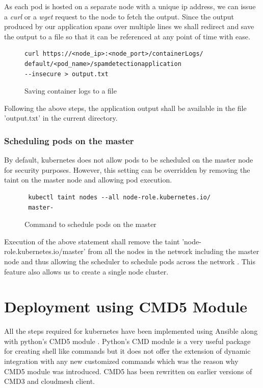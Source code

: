 \documentclass[9pt,twocolumn,twoside]{../../styles/osajnl}
\begin{document}
{\noindent
As each pod is hosted on a separate node with a unique ip address, we
can issue a \emph{curl} or a \emph{wget} request to the node to fetch
the output.  Since the output produced by our application spans over
multiple lines we shall redirect and save the output to a file so that
it can be referenced at any point of time with ease.
\begin{figure}[H]
\begin{verbatim}
curl https://<node_ip>:<node_port>/containerLogs/
default/<pod_name>/spamdetectionapplication 
--insecure > output.txt
\end{verbatim}
\caption{Saving container logs to a file}
\vspace{-4mm}
\label{Saving container logs to a file}
\end{figure}

\noindent
Following the above steps, the application output shall be available
in the file 'output.txt' in the current directory.


\subsubsection{Scheduling pods on the master}
By default, kubernetes does not allow pods to be
scheduled on the master node for security purposes. However, this
setting can be overridden by removing the taint on the master node and
allowing pod execution.
\begin{figure}[H]
\begin{verbatim}
 kubectl taint nodes --all node-role.kubernetes.io/
 master-
\end{verbatim}
\caption{Command to schedule pods on the master}
\vspace{-4mm}
\label{Command to schedule pods on the master}
\end{figure}

\noindent
Execution of the above statement shall remove the taint
'node-role.kubernetes.io/master' from all the nodes in the network
including the master node and thus allowing the scheduler to schedule
pods across the network \cite{www-kubernetes-kubeadm}. This feature
also allows us to create a single node cluster.

\section{Deployment using CMD5 Module}
All the steps required for kubernetes have been implemented using
Ansible along with python's CMD5 module \cite{www-cmd5}. Python's
CMD module is a very useful package for creating shell like commands
but it does not offer the extension of dynamic integration with any
new customized commands which was the reason why CMD5 module was
introduced. CMD5 has been rewritten on earlier versions of CMD3 and
cloudmesh client.

}
\end{document}
